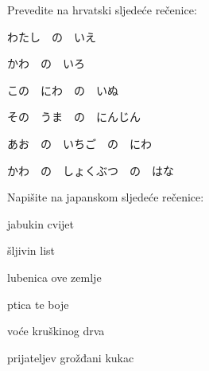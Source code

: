 
\author{Tomislav Mamić, Željka Ludošan}


	
	\begin{mondai}{Prevedite na hrvatski sljedeće rečenice:}
		\item わたし　の　いえ
		\item かわ　の　いろ

		\item この　にわ　の　いぬ
		\item その　うま　の　にんじん

		\item あお　の　いちご　の　にわ
		\item かわ　の　しょくぶつ　の　はな
	\end{mondai}	
	
	\begin{mondai}{Napišite na japanskom sljedeće rečenice:}
		\item jabukin cvijet
		\item šljivin list

		\item lubenica ove zemlje
		\item ptica te boje

		\item voće kruškinog drva
		\item prijateljev grožđani kukac 
	\end{mondai}



